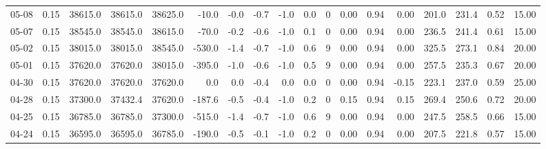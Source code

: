 \begin{threeparttable}
{\begin{tabular}{lrrrrrrrrrrrrrrrrr}
  05-08 &     0.15 & 38615.0 & 38615.0 & 38625.0 &      -10.0 &           -0.0 &                      -0.7 &                     -1.0 &                 0.0 &              0 &       0.00 &      0.94 &           0.00 &            201.0 &               231.4 &            0.52 &                  15.00 \\
  05-07 &     0.15 & 38545.0 & 38545.0 & 38615.0 &      -70.0 &           -0.2 &                      -0.6 &                     -1.0 &                 0.1 &              0 &       0.00 &      0.94 &           0.00 &            236.5 &               241.4 &            0.61 &                  15.00 \\
  05-02 &     0.15 & 38015.0 & 38015.0 & 38545.0 &     -530.0 &           -1.4 &                      -0.7 &                     -1.0 &                 0.6 &              9 &       0.00 &      0.94 &           0.00 &            325.5 &               273.1 &            0.84 &                  20.00 \\
  05-01 &     0.15 & 37620.0 & 37620.0 & 38015.0 &     -395.0 &           -1.0 &                      -0.6 &                     -1.0 &                 0.5 &              9 &       0.00 &      0.94 &           0.00 &            257.5 &               235.3 &            0.67 &                  20.00 \\
  04-30 &     0.15 & 37620.0 & 37620.0 & 37620.0 &        0.0 &            0.0 &                      -0.4 &                      0.0 &                 0.0 &              0 &       0.00 &      0.94 &          -0.15 &            223.1 &               237.0 &            0.59 &                  25.00 \\
  04-28 &     0.15 & 37300.0 & 37432.4 & 37620.0 &     -187.6 &           -0.5 &                      -0.4 &                     -1.0 &                 0.2 &              0 &       0.15 &      0.94 &           0.15 &            269.4 &               250.6 &            0.72 &                  20.00 \\
  04-25 &     0.15 & 36785.0 & 36785.0 & 37300.0 &     -515.0 &           -1.4 &                      -0.7 &                     -1.0 &                 0.6 &              9 &       0.00 &      0.94 &           0.00 &            247.5 &               258.5 &            0.66 &                  15.00 \\
  04-24 &     0.15 & 36595.0 & 36595.0 & 36785.0 &     -190.0 &           -0.5 &                      -0.1 &                     -1.0 &                 0.2 &              0 &       0.00 &      0.94 &           0.00 &            207.5 &               221.8 &            0.57 &                  15.00 \\

\end{tabular}}
\end{threeparttable}
